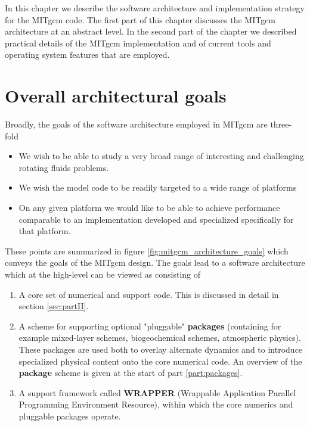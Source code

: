 
In this chapter we describe the software architecture and
implementation strategy for the MITgcm code. The first part of this
chapter discusses the MITgcm architecture at an abstract level. In the second 
part of the chapter we described practical details of the MITgcm implementation 
and of current tools and operating system features that are employed.

\section{Overall architectural goals}

Broadly, the goals of the software architecture employed in MITgcm are 
three-fold
 
\begin{itemize}
\item We wish to be able to study a very broad range
of interesting and challenging rotating fluids problems.
\item We wish the model code to be readily targeted to
a wide range of platforms
\item On any given platform we would like to be
able to achieve performance comparable to an implementation 
developed and specialized specifically for that platform.
\end{itemize}

These points are summarized in figure \ref{fig:mitgcm_architecture_goals} 
which conveys the goals of the MITgcm design. The goals lead to
a software architecture which at the high-level can be viewed as consisting 
of

\begin{enumerate}
\item A core set of numerical and support code. This is discussed in detail in
section \ref{sec:partII}.
\item A scheme for supporting optional "pluggable" {\bf packages} (containing 
for example mixed-layer schemes, biogeochemical schemes, atmospheric physics). 
These packages are used both to overlay alternate dynamics and to introduce 
specialized physical content onto the core numerical code. An overview of
the {\bf package} scheme is given at the start of part \ref{part:packages}.
\item A support framework called {\bf WRAPPER} (Wrappable Application Parallel 
Programming Environment Resource), within which the core numerics and pluggable 
packages operate.
\end{enumerate}

